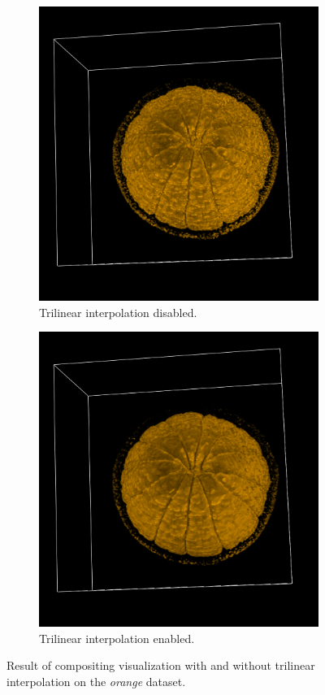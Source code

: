 \documentclass[a4paper]{article}
\begin{document}
\begin{figure}[h]
  \centering
  \begin{subfigure}[b]{0.45\textwidth}
    \centering
    \includegraphics[width=\textwidth]{trilinear-off}
    \caption{Trilinear interpolation disabled.}
  \end{subfigure}
  \hfill
  \begin{subfigure}[b]{0.45\textwidth}
    \centering
    \includegraphics[width=\textwidth]{trilinear-on}
    \caption{Trilinear interpolation enabled.}
  \end{subfigure}
  \caption{Result of compositing visualization with and without trilinear interpolation on the \textit{orange} dataset.}
  \label{fig:trilinear}
\end{figure}
\end{document}
